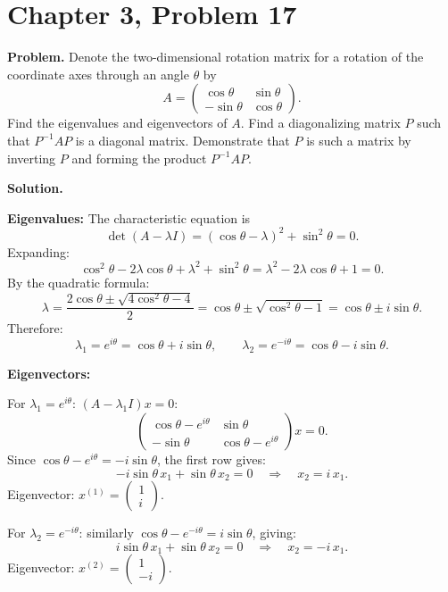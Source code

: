 \documentclass[12pt]{article}
\begin{document}
\section*{Chapter 3, Problem 17}

\textbf{Problem.} Denote the two-dimensional rotation matrix for a rotation of the coordinate axes through an angle $\theta$ by
\[
A = \begin{pmatrix} \cos\theta & \sin\theta \\ -\sin\theta & \cos\theta \end{pmatrix}.
\]
Find the eigenvalues and eigenvectors of $A$. Find a diagonalizing matrix $P$ such that $P^{-1}AP$ is a diagonal matrix. Demonstrate that $P$ is such a matrix by inverting $P$ and forming the product $P^{-1}AP$.

\bigskip
\textbf{Solution.}

\textbf{Eigenvalues:} The characteristic equation is
\[
\det(A - \lambda I) = (\cos\theta - \lambda)^2 + \sin^2\theta = 0.
\]
Expanding:
\[
\cos^2\theta - 2\lambda\cos\theta + \lambda^2 + \sin^2\theta = \lambda^2 - 2\lambda\cos\theta + 1 = 0.
\]
By the quadratic formula:
\[
\lambda = \frac{2\cos\theta \pm \sqrt{4\cos^2\theta - 4}}{2} = \cos\theta \pm \sqrt{\cos^2\theta - 1} = \cos\theta \pm i\sin\theta.
\]
Therefore:
\[
\lambda_1 = e^{i\theta} = \cos\theta + i\sin\theta, \qquad \lambda_2 = e^{-i\theta} = \cos\theta - i\sin\theta.
\]

\medskip
\textbf{Eigenvectors:}

For $\lambda_1 = e^{i\theta}$: $(A - \lambda_1 I)x = 0$:
\[
\begin{pmatrix} \cos\theta - e^{i\theta} & \sin\theta \\ -\sin\theta & \cos\theta - e^{i\theta} \end{pmatrix}x = 0.
\]
Since $\cos\theta - e^{i\theta} = -i\sin\theta$, the first row gives:
\[
-i\sin\theta\, x_1 + \sin\theta\, x_2 = 0 \quad \Rightarrow \quad x_2 = i\, x_1.
\]
Eigenvector: $x^{(1)} = \begin{pmatrix} 1 \\ i \end{pmatrix}$.

For $\lambda_2 = e^{-i\theta}$: similarly $\cos\theta - e^{-i\theta} = i\sin\theta$, giving:
\[
i\sin\theta\, x_1 + \sin\theta\, x_2 = 0 \quad \Rightarrow \quad x_2 = -i\, x_1.
\]
Eigenvector: $x^{(2)} = \begin{pmatrix} 1 \\ -i \end{pmatrix}$.
\end{document}
